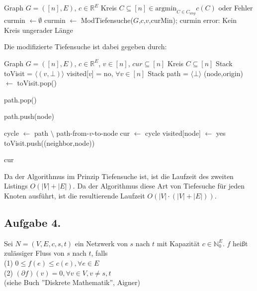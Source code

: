 \documentclass[11pt,a4paper,ngerman]{article}
\newcommand{\argmin}{\text{argmin}}
\begin{document}
\begin{algorithmic}[1]
\Require Graph $G = ([n],E)$, $c \in \mathbb{R}^E$
\Ensure Kreis $C \subseteq [n] \in \argmin_{C \in C_{ung}} c(C)$ oder Fehler
\State curmin $\gets \emptyset$
\State curmin $\gets$ ModTiefensuche($G$,$c$,$v$,curMin);
\EndFor
{}
  \State \Return curmin
\Else
  \State \Return error: Kein Kreis ungerader Länge
\EndIf
\end{algorithmic}

Die modifizierte Tiefensuche ist dabei gegeben durch: \\

\begin{algorithmic}[1]
\Require Graph $G = ([n],E)$, $c \in \mathbb{R}^E$, $v \in [n]$, $cur \subseteq [n]$
\Ensure Kreis $C \subseteq [n]$
\State Stack toVisit = $\langle (v, \bot) \rangle$
\State visited[$v$] = no, $\forall v \in [n]$
\State Stack path = $\langle \bot \rangle$
\State (node,origin) $\gets$ toVisit.pop()

\State path.pop()
\EndWhile

\State path.push(node)

\State cycle $\gets$ path $\setminus$ path-from-$v$-to-node
\State cur $\gets$ cycle
\EndIf
\Else
\State visited[node] $\gets$ yes
\State toVisit.push((neighbor,node))
\EndFor
\EndIf

\EndWhile
\State \Return cur
\end{algorithmic}

Da der Algorithmus im Prinzip Tiefensuche ist, ist die Laufzeit des zweiten Listings $O(|V| + |E|)$. Da der Algorithmus diese Art von Tiefesuche für jeden Knoten ausführt, ist die resultierende Laufzeit $O(|V| \cdot (|V| + |E|))$.

\subsection*{Aufgabe 4.}
Sei $N = (V,E,c,s,t)$ ein Netzwerk von $s$ nach $t$ mit Kapazität $c \in \mathbb{N}_0^E$.
$f$ heißt zulässiger Fluss von $s$ nach $t$, falls \\
(1) $0 \leq f(e) \leq c(e), \forall e \in E$ \\
(2) $(\partial f)(v) = 0, \forall v \in V, v \neq s, t$ \\
(siehe Buch ''Diskrete Mathematik'', Aigner) \\
\end{document}
